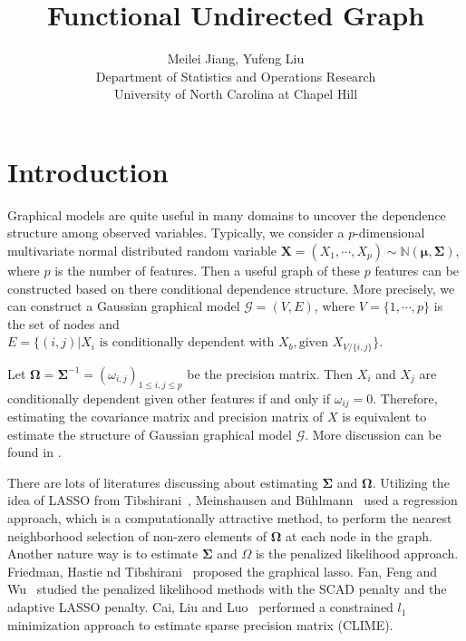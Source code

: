 \documentclass[11pt]{article}
\newcommand{\N}{\mathbb N}
\newcommand{\bX}{\mathbf X}
\newcommand{\bmu}{{\boldsymbol{\mu}}}
\newcommand{\bOmega}{{\boldsymbol{\Omega}}}
\newcommand{\bSigma}{{\boldsymbol{\Sigma}}}
\begin{document}
\author{Meilei Jiang, Yufeng Liu\\
    Department of Statistics and Operations Research\\
		University of North Carolina at Chapel Hill}
\title{Functional Undirected Graph}

\maketitle

\section{Introduction}

Graphical models are quite useful in many domains to uncover the dependence structure among observed variables. Typically, we consider a $p$-dimensional multivariate normal distributed random variable $ \bX = (X_1, \cdots, X_p) \sim \N(\bmu, \bSigma) $, where $p$ is the number of features. Then a useful graph of these $p$ features can be constructed based on there conditional dependence structure. More precisely, we can construct a Gaussian graphical model $\mathcal{G} = (V, E)$, where $V = \{ 1, \cdots, p\}$ is the set of nodes and $E = \{ (i, j) | X_i \text{ is conditionally dependent with } X_b, \text{given } X_{V/\{i, j\}}\}$.     

Let $\bOmega = \bSigma^{-1} = (\omega_{i,j})_{1\leq i, j \leq p}$ be the precision matrix. Then $X_i$ and $X_j$ are conditionally dependent given other features if and only if $\omega_{ij} = 0$. Therefore, estimating the covariance matrix and precision matrix of $X$ is equivalent to estimate the structure of Gaussian graphical model $\mathcal{G}$. More discussion can be found in \cite{lauritzen1996graphical}.

There are lots of literatures discussing about estimating $\bSigma$ and $\bOmega$. Utilizing the idea of LASSO from Tibshirani~\cite{tibshirani1996regression}, Meinshausen and B{\"u}hlmann~\cite{meinshausen2006high} used a regression approach, which is a computationally attractive method, to perform the nearest neighborhood selection of non-zero elements of $\bOmega$ at each node in the graph. Another nature way is to estimate $\bSigma$ and $\Omega$ is the penalized likelihood approach. Friedman, Hastie nd Tibshirani~\cite{friedman2008sparse} proposed the graphical lasso. Fan, Feng and Wu~\cite{fan2009network} studied the penalized likelihood methods with the SCAD penalty and the adaptive LASSO penalty. Cai, Liu and Luo~\cite{cai2011constrained} performed a constrained $l_1$ minimization approach to estimate sparse precision matrix (CLIME). 
\end{document}

